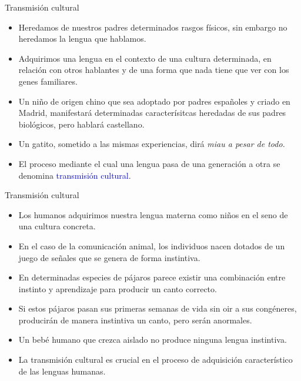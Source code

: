 \documentclass[handout]{beamer}
\begin{document}
\begin{frame}{Transmisión cultural}

\begin{itemize}
	\item Heredamos de nuestros padres determinados rasgos físicos, sin embargo no heredamos la lengua que hablamos.
	\item Adquirimos una lengua en el contexto de una cultura determinada, en relación con otros hablantes y de una forma que nada tiene que ver con los genes familiares.
	\item Un niño de origen chino que sea adoptado por padres españoles y criado en Madrid, manifestará determinadas caracterísitcas heredadas de sus padres biológicos, pero hablará castellano. 
	\item Un gatito, sometido a las mismas experiencias, dirá \it{miau} a pesar de todo.
	\item El proceso mediante el cual una lengua pasa de una generación a otra se denomina \textcolor{blue}{transmisión cultural}.
\end{itemize}

\end{frame}

\begin{frame}{Transmisión cultural}

\begin{itemize}
	\item Los humanos adquirimos nuestra lengua materna como niños en el seno de una cultura concreta.
	\item En el caso de la comunicación animal, los individuos nacen dotados de un juego de señales que se genera de forma instintiva.
	\item En determinadas especies de pájaros parece existir una combinación entre instinto y aprendizaje para producir un canto correcto. 
	\item Si estos pájaros pasan sus primeras semanas de vida sin oir a sus congéneres, producirán de manera instintiva un canto, pero serán anormales.
	\item Un bebé humano que crezca aislado no produce ninguna lengua instintiva.
	\item La transmisión cultural es crucial en el proceso de adquisición característico de las lenguas humanas.
\end{itemize}

\end{frame}
\end{document}
